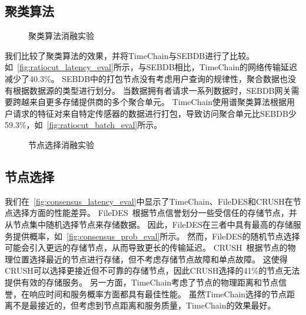 \subsection{聚类算法}
\begin{figure*}[t]
    \centering
	\begin{minipage}{0.96\linewidth}
        \caption{聚类算法消融实验} 
    \end{minipage}
\end{figure*}

我们比较了聚类算法的效果，并将TimeChain与SEBDB进行了比较。
如~\autoref{fig:ratiocut_latency_eval}所示，与SEBDB相比，TimeChain的网络传输延迟减少了40.3\%。
SEBDB中的打包节点没有考虑用户查询的规律性，聚合数据也没有根据数据源的类型进行划分。
当数据拥有者请求一系列数据时，SEBDB网关需要跨越来自更多存储提供商的多个聚合单元。
TimeChain使用谱聚类算法根据用户请求的特征对来自特定传感器的数据进行打包，导致访问聚合单元比SEBDB少59.3\%，如~\autoref{fig:ratiocut_batch_eval}所示。

\begin{figure*}[t]
    \centering
    \begin{minipage}{0.96\linewidth}
        \vspace{0.5ex}
        \caption{节点选择消融实验} 
    \end{minipage}
\end{figure*}

\subsection{节点选择}
我们在~\autoref{fig:consensus_latency_eval}中显示了TimeChain、FileDES和CRUSH在节点选择方面的性能差异。
FileDES~\cite{xu2024filedes}根据节点信誉划分一些受信任的存储节点，并从节点集中随机选择节点来存储数据。
因此，FileDES在三者中具有最高的存储服务提供概率，如~\autoref{fig:consensus_prob_eval}所示。
然而，FileDES的随机节点选择可能会引入更远的存储节点，从而导致更长的传输延迟。
CRUSH~\cite{weil2006ceph}根据节点的物理位置选择最近的节点进行存储，但不考虑存储节点故障和单点故障。
这使得CRUSH可以选择更接近但不可靠的存储节点，因此CRUSH选择的41\%的节点无法提供有效的存储服务。
另一方面，TimeChain考虑了节点的物理距离和节点信誉，在响应时间和服务概率方面都具有最佳性能。
虽然TimeChain选择的节点距离不是最接近的，但考虑到节点距离和服务质量，TimeChain的效果最好。

